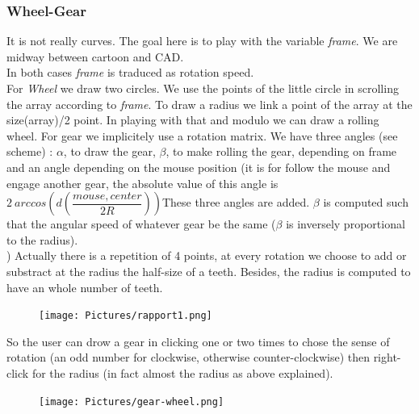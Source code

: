 \documentclass{article}
\begin{document}
\subsubsection*{Wheel-Gear}
It is not really curves. The goal here is to play with the variable \textit{frame}. We are midway between cartoon and CAD.\\
In both cases \textit{frame} is traduced as rotation speed. \\
For \textit{Wheel} we draw two circles. We use the points of the little circle in scrolling the array according to \textit{frame}. To draw a radius we link a point of the array at the size(array)/2 point. In playing with that and modulo we can draw a rolling wheel.
For gear we implicitely use a rotation matrix. We have three angles (see scheme) : $\alpha$, to draw the gear, $\beta$, to make rolling the gear, depending on frame and an angle depending on the mouse position (it is for follow the mouse and engage another gear, the absolute value of this angle is $2\ arccos(d(\dfrac{mouse,center}{2 R}))$These three angles are added. $\beta$ is computed such that the angular speed of whatever gear be the same ($\beta$ is inversely proportional to the radius).\\ )
Actually there is a repetition of 4 points, at every rotation we choose to add or substract at the radius the half-size of a teeth. Besides, the radius is computed to have an whole number of teeth.\\
\begin{figure}[H]
   \texttt{[image: Pictures/rapport1.png]}
\end{figure}
So the user can drow a gear in clicking one or two times to chose the sense of rotation (an odd number for clockwise, otherwise counter-clockwise) then right-click for the radius (in fact almost the radius as above explained).
\begin{figure}[H]
   \texttt{[image: Pictures/gear-wheel.png]}
\end{figure}
\end{document}
